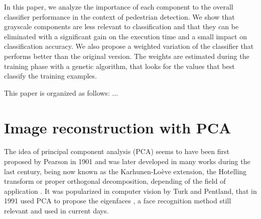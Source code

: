 \documentclass[10pt, conference, compsocconf]{IEEEtran}
\begin{document}


In this paper, we analyze the importance of each component to the overall classifier performance in the context of pedestrian detection. We show that grayscale components are less relevant to classification and that they can be eliminated with a significant gain on the execution time and a small impact on classification accuracy. We also propose a weighted variation of the classifier that performs better than the original version. The weights are estimated during the training phase with a genetic algorithm, that looks for the values that best classify the training examples.

This paper is organized as follows: ... 

\section{Image reconstruction with PCA}

The idea of principal component analysis (PCA) seems to have been first proposed by Pearson in 1901 \cite{pearson1901} and was later developed in many works during the last century, being now known as the Karhunen-Loève extension, the Hotelling transform or proper orthogonal decomposition, depending of the field of application \cite{serovich87}. It was popularized in computer vision by Turk and Pentland, that in 1991 used PCA to propose the eigenfaces \cite{turk91}, a face recognition method still relevant and used in current days. %
\end{document}
